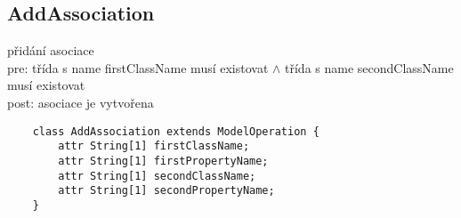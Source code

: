 \documentclass[11pt,a4paper]{article}
\begin{document}
	\subsection{AddAssociation}
	přidání asociace\\
	pre: třída s name firstClassName musí existovat $\wedge$ třída s name
	secondClassName musí existovat\\
	post: asociace je vytvořena
	\begin{verbatim}
    class AddAssociation extends ModelOperation {
        attr String[1] firstClassName;
        attr String[1] firstPropertyName;
        attr String[1] secondClassName;
        attr String[1] secondPropertyName;
    }
    \end{verbatim}
									
\end{document}
